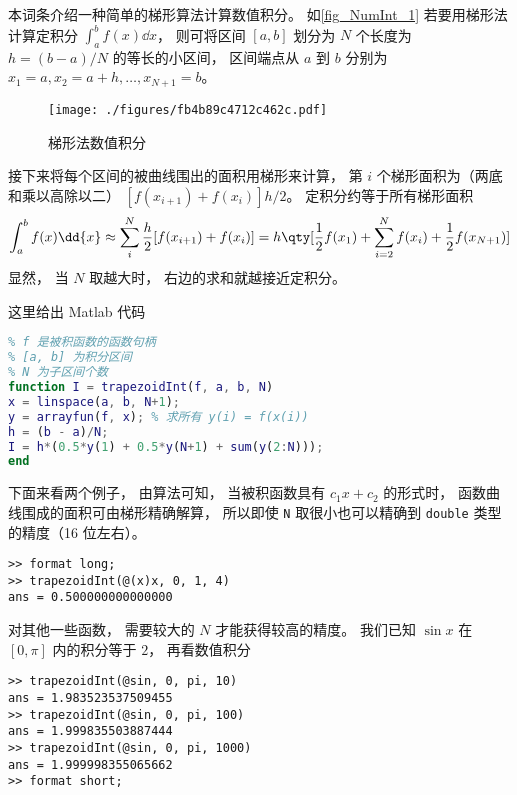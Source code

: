 

本词条介绍一种简单的梯形算法计算数值积分。 如\autoref{fig_NumInt_1} 若要用梯形法计算定积分 $\int_a^b f(x) \dd{x}$， 则可将区间 $[a, b]$ 划分为 $N$ 个长度为 $h = (b-a)/N$ 的等长的小区间， 区间端点从 $a$ 到 $b$ 分别为 $x_1 = a, x_2 = a + h, \dots, x_{N+1} = b$。

\begin{figure}[ht]
\centering
\texttt{[image: ./figures/fb4b89c4712c462c.pdf]}
\caption{梯形法数值积分} \label{fig_NumInt_1}
\end{figure}

接下来将每个区间的被曲线围出的面积用梯形来计算， 第 $i$ 个梯形面积为（两底和乘以高除以二）
$[f(x_{i+1}) + f(x_i)]h/2$。 定积分约等于所有梯形面积
\begin{equation}\label{eq_NumInt_1}
\int_a^b f(x) \dd{x} \approx \sum_i^N  \frac h2 [f(x_{i+1}) + f(x_i)]
= h\qty[ \frac12 f(x_1) + \sum_{i = 2}^N f(x_i) + \frac12 f(x_{N+1})]
\end{equation}
显然， 当 $N$ 取越大时， 右边的求和就越接近定积分。

这里给出 Matlab 代码

\begin{lstlisting}[language=matlab, caption=trapezoidInt.m]
% 梯形法数值积分
% f 是被积函数的函数句柄
% [a, b] 为积分区间
% N 为子区间个数
function I = trapezoidInt(f, a, b, N)
x = linspace(a, b, N+1);
y = arrayfun(f, x); % 求所有 y(i) = f(x(i))
h = (b - a)/N;
I = h*(0.5*y(1) + 0.5*y(N+1) + sum(y(2:N)));
end
\end{lstlisting}

下面来看两个例子， 由算法可知， 当被积函数具有 $c_1 x + c_2$ 的形式时， 函数曲线围成的面积可由梯形精确解算， 所以即使 \verb|N| 取很小也可以精确到 \verb|double| 类型的精度（16 位左右）。
\begin{lstlisting}[language=matlabC]
>> format long;
>> trapezoidInt(@(x)x, 0, 1, 4)
ans = 0.500000000000000
\end{lstlisting}
对其他一些函数， 需要较大的 $N$ 才能获得较高的精度。 我们已知 $\sin x$ 在 $[0, \pi]$ 内的积分等于 $2$， 再看数值积分
\begin{lstlisting}[language=matlabC]
>> trapezoidInt(@sin, 0, pi, 10)
ans = 1.983523537509455
>> trapezoidInt(@sin, 0, pi, 100)
ans = 1.999835503887444
>> trapezoidInt(@sin, 0, pi, 1000)
ans = 1.999998355065662
>> format short;
\end{lstlisting}
